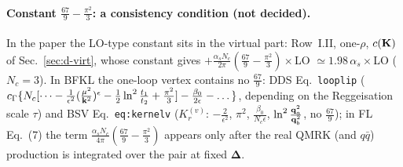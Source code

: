 \paragraph{Constant $\frac{67}{9}-\frac{\pi^2}{3}$: a consistency condition (not decided).} In the paper the LO-type constant sits in the virtual part: Row~I.II, one-$\rho$, $c(\mathbf{K})$ of Sec.~\ref{sec:d-virt}, whose constant gives $+\frac{\alpha_sN_c}{2\pi}(\frac{67}{9}-\frac{\pi^2}{3})\times$LO $\simeq1.98\,\alpha_s\times$LO ($N_c=3$). In BFKL the one-loop vertex contains no $\frac{67}{9}$: DDS Eq.~\texttt{looplip} ($c_\Gamma\{N_c[\dots-\frac{1}{\epsilon^2}(\frac{\mu^2}{\mathbf{k}^2})^\epsilon-\frac12\ln^2\frac{t_1}{t_2}+\frac{\pi^2}{3}]-\frac{\beta_0}{2\epsilon}-\dots\}$, depending on the Reggeisation scale $\tau$) and BSV Eq.~\texttt{eq:kernelv} ($K^{(v)}_r$: $-\frac{2}{\epsilon^2}$, $\pi^2$, $\frac{\beta_0}{N_c\epsilon}$, $\ln^2\frac{\mathbf{q}_a^2}{\mathbf{q}_b^2}$, no $\frac{67}{9}$); in FL Eq.~(7) the term $\frac{\alpha_sN_c}{4\pi}(\frac{67}{9}-\frac{\pi^2}{3})$ appears only after the real QMRK (and $q\bar q$) production is integrated over the pair at fixed $\boldsymbol\Delta$.

